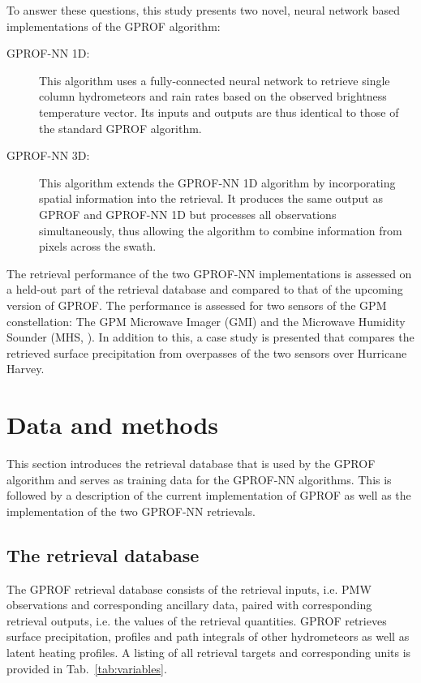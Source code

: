 \documentclass[a4paper,11pt,bibtotoc]{scrartcl}
\begin{document}
To answer these questions, this study presents two novel, neural network based
implementations of the GPROF algorithm:
\begin{description}
\item[GPROF-NN 1D:] This algorithm uses a fully-connected neural network to
  retrieve single column hydrometeors and rain rates based on the observed
  brightness temperature vector. Its inputs and outputs are thus identical to
  those of the standard GPROF algorithm.
\item[GPROF-NN 3D:] This algorithm extends the GPROF-NN 1D algorithm by
  incorporating spatial information into the retrieval. It produces the same
  output as GPROF and GPROF-NN 1D but processes all observations simultaneously,
  thus allowing the algorithm to combine information from pixels across the
  swath.
\end{description}
The retrieval performance of the two GPROF-NN implementations is assessed on a
held-out part of the retrieval database and compared to that of the upcoming
version of GPROF. The performance is assessed for two sensors of the GPM
constellation: The GPM Microwave Imager (GMI) and the Microwave Humidity Sounder
(MHS, \citet{bonsignori07}). In addition to this, a case study is presented that
compares the retrieved surface precipitation from overpasses of the two sensors
over Hurricane Harvey.

\section{Data and methods}

This section introduces the retrieval database that is used by the GPROF
algorithm and serves as training data for the GPROF-NN algorithms. This
is followed by a description of the current implementation of GPROF as well
as the implementation of the two GPROF-NN retrievals.

\subsection{The retrieval database}

The GPROF retrieval database consists of the retrieval inputs, i.e. PMW observations
and corresponding ancillary data, paired with corresponding retrieval outputs,
i.e. the values of the retrieval quantities. GPROF retrieves surface
precipitation, profiles and path integrals of other hydrometeors as well as
latent heating profiles. A listing of all retrieval targets and corresponding
units is provided in Tab.~\ref{tab:variables}.
\end{document}
